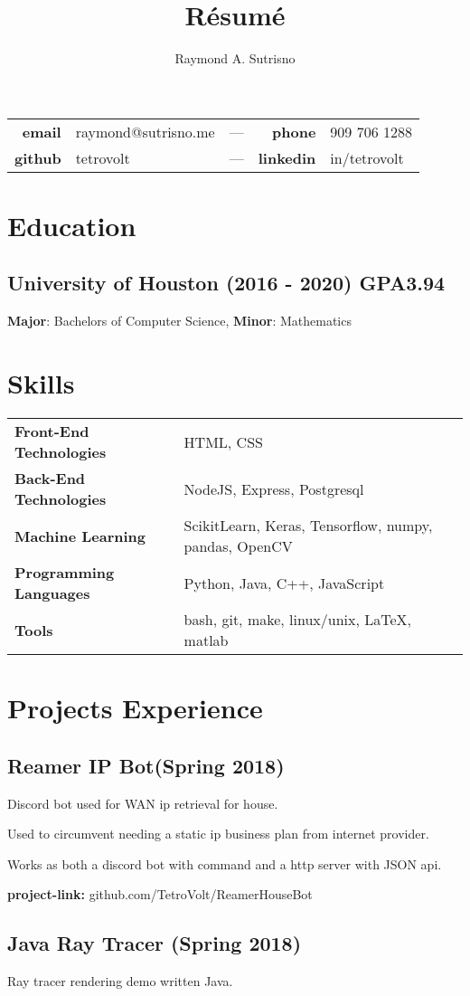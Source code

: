\documentclass{article}
\title{R\'esum\'e}
\author{Raymond A. Sutrisno}
\date{}
\makeatletter
\renewcommand{\maketitle}{
\begin{center}
{\Large\bfseries\theauthor}
\vspace{.25em}

\begin{center}
\begin{tabular}{ r l c r l }
 \textbf{email} & raymond@sutrisno.me & --- & \textbf{phone} & 909 706 1288 \\
 \textbf{github} & tetrovolt & --- & \textbf{linkedin} & in/tetrovolt
\end{tabular}
\end{center}

\end{center}
}
\makeatother
\begin{document}
\maketitle

\section{Education}
\subsection{University of Houston (2016 - 2020) \textbf{GPA}{3.94}}
\textbf{Major}: Bachelors of Computer Science, \textbf{Minor}: Mathematics

\section{Skills}
\begin{tabular}{p{5cm} l}
    \textbf{Front-End Technologies} & HTML, CSS \\
    \textbf{Back-End Technologies} & NodeJS, Express, Postgresql \\
    \textbf{Machine Learning} & ScikitLearn, Keras, Tensorflow, numpy, pandas, OpenCV \\
    \textbf{Programming Languages} & Python, Java, C++, JavaScript  \\
    \textbf{Tools} & bash, git, make, linux/unix, \LaTeX, matlab
\end{tabular}

\section{Projects Experience}
\subsection{Reamer IP Bot\textbf{(Spring 2018)}}
\noindent{$\ \bullet$} Discord bot used for WAN ip retrieval for house.

\noindent{$\ \bullet$} Used to circumvent needing a static ip business plan from internet provider.

\noindent{$\ \bullet$} Works as both a discord bot with command and a http server with JSON api.

\noindent{$\ \bullet$} \textbf{project-link:} github.com/TetroVolt/ReamerHouseBot

\subsection{Java Ray Tracer \textbf{(Spring 2018)}}
\noindent{$\ \bullet$} Ray tracer rendering demo written Java.
\end{document}
